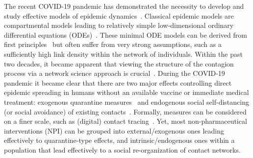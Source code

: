 \documentclass[12pt]{article}
\begin{document}
The recent COVID-19 pandemic has demonstrated the necessity to develop and study effective models of epidemic dynamics~\cite{AndersonMay}. Classical epidemic models are compartmental models leading to relatively simple low-dimensional ordinary differential equations (ODEs)~\cite{BrauervandenDriesscheWu,DiekmannHeesterbeek}. These minimal ODE models can be derived from first principles~\cite{KissMillerSimon} but often suffer from very strong assumptions, such as a sufficiently high link density within the network of individuals. Within the past two decades, it became apparent that viewing the structure of the contagion process via a network science approach is crucial~\cite{Pastor-SatorrasVespignani,ColizzaBarratBarthelemyVespignani,Durrett,HouseKeeling,Pastor-Satorrasetal,ThurnerKlimekHanel}. During the COVID-19 pandemic it became clear that there are two major effects controlling direct epidemic spreading in humans without an available vaccine or immediate medical treatment: exogenous quarantine measures~\cite{MaierBrockmann,Kucharskietal} and endogenous social self-distancing (or social avoidance) of existing contacts~\cite{Giordanoetal}. Formally, measures can be considered on a finer scale, such as (digital) contact tracing~\cite{Ferrettietal,Kretzschmaretal}. Yet, most non-pharmaceutical interventions (NPI) can be grouped into external/exogenous ones leading effectively to quarantine-type effects, and intrinsic/endogenous ones within a population that lead effectively to a social re-organization of contact networks. 
\end{document}
